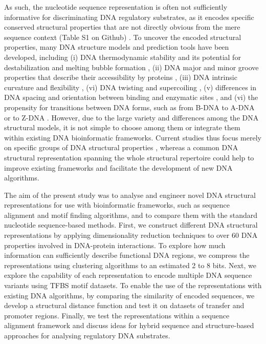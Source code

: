 \documentclass[sigconf]{acmart}
\begin{document}
As such, the nucleotide sequence representation is often not sufficiently informative for discriminating DNA regulatory substrates, as it encodes specific conserved structural properties that are not directly obvious from the mere sequence context (Table S1 on Github) \cite{Zrimec2018-lx,Tosato2017-nq,Levo2015-iu}. To uncover the encoded structural properties, many DNA structure models and prediction tools have been developed, including (i) DNA thermodynamic stability and its potential for destabilization and melting bubble formation \cite{Zrimec2015-xf}, (ii) DNA major and minor groove properties that describe their accessibility by proteins \cite{Bishop2011-jm,Rohs2009-hm}, (iii) DNA intrinsic curvature \cite{Geggier2010-mw} and flexibility \cite{Watson2008-dt}, (vi) DNA twisting and supercoiling \cite{Watson2008-dt}, (v) differences in DNA spacing and orientation between binding and enzymatic sites \cite{Geggier2010-mw}, and (vi) the propensity for transitions between DNA forms, such as from B-DNA to A-DNA or to Z-DNA \cite{Kulkarni2013-xm,Watson2008-dt}. However, due to the large variety and differences among the DNA structural models, it is not simple to choose among them or integrate them within existing DNA bioinformatic frameworks. Current studies thus focus merely on specific groups of DNA structural properties \cite{Rohs2009-hm,Zrimec2018-lx,Zrimec2013-ds,Samee2019-xj,Chen2012-gd}, whereas a common DNA structural representation spanning the whole structural repertoire could help to improve existing frameworks and facilitate the development of new DNA algorithms. 

The aim of the present study was to analyse and engineer novel DNA structural representations for use with bioinformatic frameworks, such as sequence alignment and motif finding algorithms, and to compare them with the standard nucleotide sequence-based methods. First, we construct different DNA structural representations by applying dimensionality reduction techniques to over 60 DNA properties involved in DNA-protein interactions. To explore how much information can sufficiently describe functional DNA regions, we compress the representations using clustering algorithms to an estimated 2 to 8 bits. Next, we explore the capability of each representation to encode multiple DNA sequence variants using TFBS motif datasets. To enable the use of the representations with existing DNA algorithms, by comparing the similarity of encoded sequences, we develop a structural distance function and test it on datasets of transfer and promoter regions. Finally, we test the representations within a sequence alignment framework and discuss ideas for hybrid sequence and structure-based approaches for analysing regulatory DNA substrates.
\end{document}
